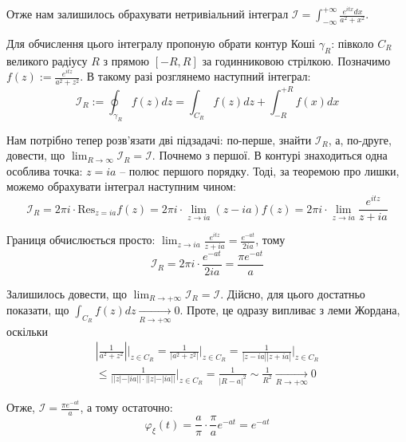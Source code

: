 \documentclass[oneside,solution]{karazin-prob-theory-assign}
\begin{document}
Отже нам залишилось обрахувати нетривіальний інтеграл $\mathcal{I} = \int_{-\infty}^{+\infty} \frac{e^{itx}dx}{a^2+x^2}$.

Для обчислення цього інтегралу пропоную обрати контур Коші $\gamma_R$: півколо $C_R$ великого радіусу $R$ з прямою $[-R,R]$ за годинниковою стрілкою. Позначимо $f(z) := \frac{e^{itz}}{a^2+z^2}$. В такому разі розглянемо наступний інтеграл:
\begin{equation}
    \mathcal{I}_R := \oint_{\gamma_R} f(z)dz = \int_{C_R}f(z)dz + \int_{-R}^{+R} f(x)dx
\end{equation}

Нам потрібно тепер розв'язати дві підзадачі: по-перше, знайти $\mathcal{I}_R$, а, по-друге, довести, що $\lim_{R \to \infty}\mathcal{I}_R = \mathcal{I}$. Почнемо з першої. В контурі знаходиться одна особлива точка: $z=ia$ -- полюс першого порядку. Тоді, за теоремою про лишки, можемо обрахувати інтеграл наступним чином:
\begin{equation}
    \mathcal{I}_R = 2\pi i \cdot \text{Res}_{z=ia}f(z) = 2\pi i \cdot \lim_{z \to ia} (z-ia)f(z) = 2\pi i \cdot \lim_{z \to ia}\frac{e^{itz}}{z+ia}
\end{equation}

Границя обчислюється просто: $\lim_{z \to ia} \frac{e^{itz}}{z+ia} = \frac{e^{-at}}{2ia}$, тому
\begin{equation}
    \mathcal{I}_R = 2\pi i \cdot \frac{e^{-at}}{2ia} = \frac{\pi e^{-at}}{a}
\end{equation}

Залишилось довести, що $\lim_{R \to +\infty} \mathcal{I}_R = \mathcal{I}$. Дійсно, для цього достатньо показати, що $\int_{C_R}f(z)dz \xrightarrow[R \to +\infty]{} 0$. Проте, це одразу випливає з леми Жордана, оскільки 
\begin{gather}
    \left|\frac{1}{a^2+z^2}\right|\Big|_{z \in C_R} = \frac{1}{|a^2+z^2|}\Big|_{z \in C_R} = \frac{1}{|z-ia||z+ia|}\Big|_{z \in C_R} \\ \leq \frac{1}{||z|-|ia||\cdot ||z|-|ia||}\Big|_{z \in C_R} = \frac{1}{|R - a|^2} \sim \frac{1}{R^2} \xrightarrow[R \to +\infty]{} 0
\end{gather}

Отже, $\mathcal{I} = \frac{\pi e^{-at}}{a}$, а тому остаточно:
\begin{equation}
    \varphi_{\xi}(t) = \frac{a}{\pi} \cdot \frac{\pi}{a}e^{-at} = \boxed{e^{-at}}
\end{equation}
\end{document}
